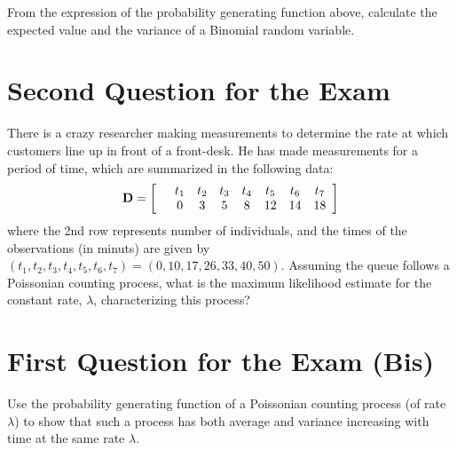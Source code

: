 \documentclass{article}
\begin{document}
From the expression of the probability generating function above, calculate the expected value and the variance of a Binomial random variable. 

\section{Second Question for the Exam}
There is a crazy researcher making measurements to determine the rate at which customers line up in front of a front-desk. He has made measurements for a period of time, which are summarized in the following data:
\begin{equation}
\label{eq:Measures}
{\bf D} = 
\left[
\begin{array}{rccccccc}
& t_1 & t_2 & t_3 & t_4  & t_5 & t_6 & t_7                             \\
& 0   & 3   & 5   & 8    & 12  & 14  & 18                               
\end{array}
\right]
\end{equation}
where the 2nd row represents number of individuals, and the times of the observations (in minuts) are given by $(t_1, t_2, t_3, t_4, t_5, t_6, t_7) = (0, 10, 17, 26, 33, 40, 50)$. Assuming the queue follows a Poissonian counting process, what is the maximum likelihood estimate for the constant rate, $\lambda$, characterizing this process? 

\section{First Question for the Exam (Bis)}
Use the probability generating function of a Poissonian counting process (of rate $\lambda$) to show that such a process has both average and variance increasing with time at the same rate $\lambda$. 
\end{document}
